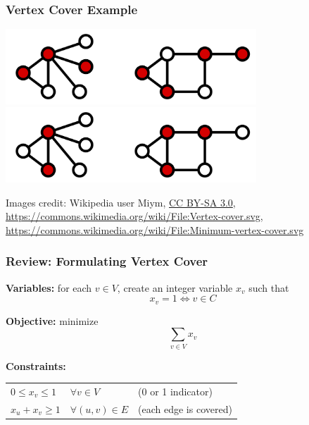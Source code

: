 \documentclass[10pt,aspectratio=169]{beamer}
\begin{document}
\begin{frame} \frametitle{Vertex Cover Example}
  \begin{center}
    \includegraphics[height=80pt]{13-vertex-cover-1.png}
    \includegraphics[height=80pt]{13-vertex-cover-2.png}
  \end{center}

  {\tiny
  Images credit: Wikipedia user Miym,
  \href{https://creativecommons.org/licenses/by-sa/3.0)}{CC BY-SA 3.0},
  \url{https://commons.wikimedia.org/wiki/File:Vertex-cover.svg},
  \url{https://commons.wikimedia.org/wiki/File:Minimum-vertex-cover.svg}
  }
\end{frame}

\begin{frame} \frametitle{Review: Formulating Vertex Cover}
  \textbf{Variables:} for each $v \in V$, create an integer variable $x_v$ such that
  \[ x_v = 1 \Leftrightarrow v \in C \]
  
  \textbf{Objective:} minimize
  \[ \sum_{v \in V} x_v \]
  
  \textbf{Constraints:}
  \begin{tabular}{lll}
    $0 \leq x_v \leq 1$ & $\forall v \in V$ & (0 or 1 indicator) \\
    $x_u + x_v \geq 1$ & $\forall (u, v) \in E$ & (each edge is covered)
  \end{tabular}
  
\end{frame}
\end{document}
